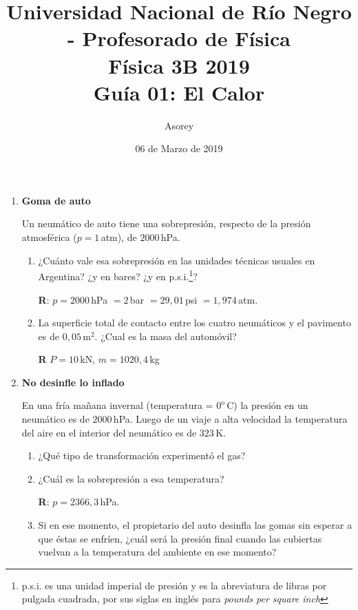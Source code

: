 \documentclass[a4paper,12pt]{article}
\begin{document}
\title{
{\normalsize{Universidad Nacional de Río Negro - Profesorado de Física}}\\
Física 3B  2019 \\ Guía 01: El Calor}
\author{Asorey}
\date{06 de Marzo de 2019}
\maketitle

\begin{enumerate}
	\setcounter{enumi}{0}

	\item {\bf{Goma de auto}}
		
		Un neumático de auto tiene una sobrepresión, respecto de la presión
		atmosférica ($p=1$\,atm), de $2000$\,hPa.
		\begin{enumerate}
			\item ¿Cuánto vale esa sobrepresión en las unidades técnicas usuales en
				Argentina? ¿y en bares? ¿y en p.s.i.\footnote{p.s.i. es una
				unidad imperial de presión y es la abreviatura de libras por
				pulgada cuadrada, por sus siglas en inglés para {\textit{pounds
				per square inch}}}? 
				
				{\bf R}: $p=2000$\,hPa $= 2$\,bar $= 29,01$\,psi $= 1,974$\,atm.
			\item La superficie total de contacto entre los cuatro neumáticos y
				el pavimento es de $0,05$\,m$^2$. ¿Cual es la masa del
				automóvil?
				
				{\bf R} $P = 10$\,kN, $m=1020,4$\,kg
		\end{enumerate}
	
	\item {\bf{No desinfle lo inflado}}
		
		En una fría mañana invernal (temperatura = $0^\mathrm{o}$\,C) la
		presión en un neumático es de $2000$\,hPa. Luego de un viaje a alta
		velocidad la temperatura del aire en el interior del neumático es de
		$323$\,K.
		\begin{enumerate}
			\item ¿Qué tipo de transformación experimentó el gas?
			\item ¿Cuál es la sobrepresión a esa temperatura?

				{\bf R}: $p=2366,3$\,hPa.
			\item Si en ese momento, el propietario del auto desinfla las gomas
				sin esperar a que éstas se enfríen, ¿cuál será la presión final
				cuando las cubiertas vuelvan a la temperatura del ambiente en
				ese momento?


\end{enumerate}
\end{enumerate}
\end{document}

